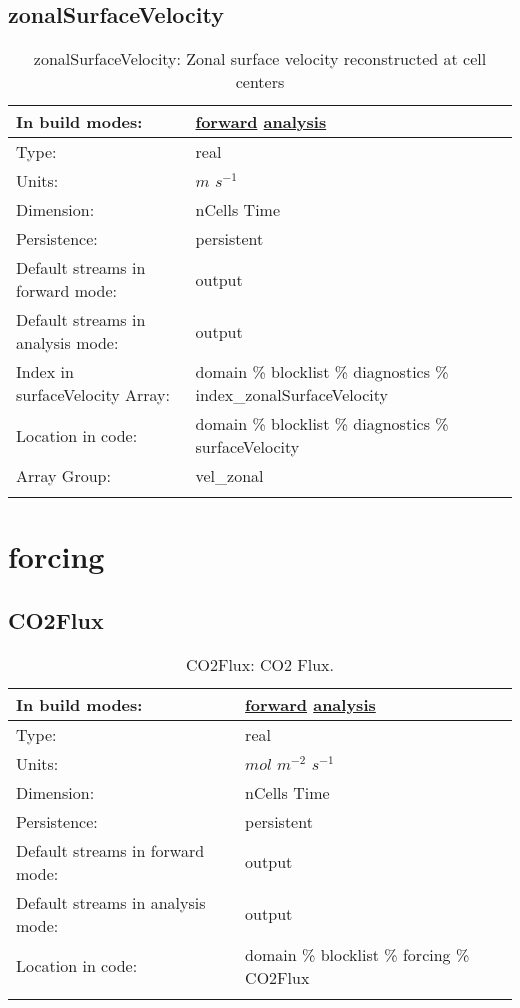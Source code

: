 \subsection[zonalSurfaceVelocity]{zonalSurfaceVelocity}
\label{subsec:var_sec_diagnostics_zonalSurfaceVelocity}
\begin{center}
\begin{longtable}{| p{2.0in} | p{4.0in} |}
        \hline 
        In build modes: & \hyperref[subsec:forward_var_tab_diagnostics]{forward} \hyperref[subsec:analysis_var_tab_diagnostics]{analysis} \\
        \hline 
        Type: & real \\
        \hline 
        Units: & $m$ $s^{-1}$ \\
        \hline 
        Dimension: & nCells Time \\
        \hline 
        Persistence: & persistent \\
        \hline 
		 Default streams in forward mode: &  output \\
        \hline 
		 Default streams in analysis mode: &  output \\
        \hline 
		 Index in surfaceVelocity Array: & domain \% blocklist \% diagnostics \% index\_zonalSurfaceVelocity \\
		 \hline 
		 Location in code: & domain \% blocklist \% diagnostics \% surfaceVelocity \\
		 \hline 
		 Array Group: & vel\_zonal \\
		 \hline 
    \caption{zonalSurfaceVelocity: Zonal surface velocity reconstructed at cell centers}
\end{longtable}
\end{center}
\section[forcing]{forcing}
\label{sec:var_sec_forcing}
\subsection[CO2Flux]{CO2Flux}
\label{subsec:var_sec_forcing_CO2Flux}
\begin{center}
\begin{longtable}{| p{2.0in} | p{4.0in} |}
        \hline 
        In build modes: & \hyperref[subsec:forward_var_tab_forcing]{forward} \hyperref[subsec:analysis_var_tab_forcing]{analysis} \\
        \hline 
        Type: & real \\
        \hline 
        Units: & $mol$ $m^{-2}$ $s^{-1}$ \\
        \hline 
        Dimension: & nCells Time \\
        \hline 
        Persistence: & persistent \\
        \hline 
		 Default streams in forward mode: &  output \\
        \hline 
		 Default streams in analysis mode: &  output \\
        \hline 
		 Location in code: & domain \% blocklist \% forcing \% CO2Flux \\
		 \hline 
    \caption{CO2Flux: CO2 Flux.}
\end{longtable}
\end{center}
